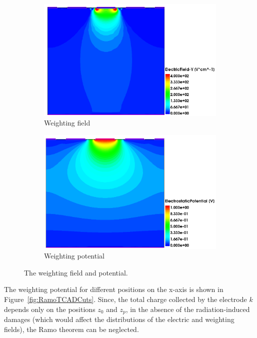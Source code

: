\begin{figure}[htbp]
  \centering
  \begin{subfigure}[b]{0.49\textwidth}
    \centering
    \includegraphics[width=\textwidth]{figures/Ramo/EfieldY_Ramo.png}
    \caption{Weighting field}\label{fig:WeightingFieldRamo}
  \end{subfigure}\hfill
  \begin{subfigure}[b]{0.49\textwidth}
    \centering
    \includegraphics[width=\textwidth]{figures/Ramo/RamoPotential.png}
    \caption{Weighting potential}\label{fig:WeightingPotentialRamo}
  \end{subfigure} 
  \caption{The weighting field and potential.}\label{fig:RamoTCAD}
\end{figure}

The weighting potential for different positions on the
x-axis is shown in Figure~\ref{fig:RamoTCADCuts}. Since, the total
charge collected by the electrode $k$ depends only on the positions
$z_0$ and $z_p$, in the absence of the radiation-induced damages
(which would affect the distributions of the electric and weighting
fields), the Ramo theorem can be neglected.


